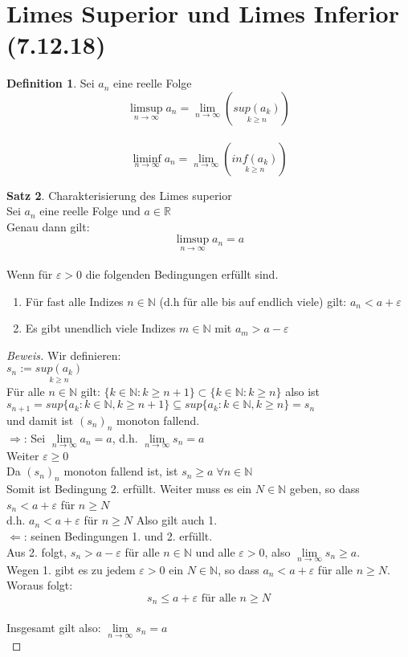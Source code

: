 \documentclass[12pt,a4paper,titlepage]{article} %
\theoremstyle{definition}
\newtheorem{satz}{Satz}[subsection]
\newtheorem{defi}[satz]{Definition}
\theoremstyle{remark}
\newenvironment{bew}{\begin{proof}[Beweis]}{\end{proof}}
\newcommand{\N}{\mathbb{N}}
\newcommand{\R}{\mathbb{R}}
\newcommand{\limes}[1]{\lim\limits_{#1\rightarrow\infty}}
\newcommand{\limessup}[1]{\limsup \limits_{#1\rightarrow\infty}}
\newcommand{\limesinf}[1]{\liminf \limits_{#1\rightarrow\infty}}
\begin{document}
	\section{Limes Superior und Limes Inferior (7.12.18)}
	\begin{defi}
		Sei \(a_n\) eine reelle Folge\\
		\[\limessup{n} a_n = \limes{n} (\underset{k \geq n}{sup(a_k)}) \]\\
		\[\limesinf{n} a_n = \limes{n} (\underset{k \geq n}{inf(a_k)}) \]
	\end{defi}
	\begin{satz}
		Charakterisierung des Limes superior\\
		Sei \(a_n\) eine reelle Folge und \(a \in \R\)\\
		Genau dann gilt:\\
		\[\limessup{n} a_n = a\]\\
		Wenn für \(\varepsilon > 0\) die folgenden Bedingungen erfüllt sind.\\
		\begin{enumerate}
			\item Für fast alle Indizes \(n \in \N\) (d.h für alle bis auf endlich viele) gilt: \(a_n < a+ \varepsilon\)
			\item Es gibt unendlich viele Indizes \(m \in \N\) mit \(a_m > a - \varepsilon\)
		\end{enumerate}
	\end{satz}
	\begin{bew}
		Wir definieren:\\
		\(s_n := \underset{k \geq n}{sup(a_k)}\)\\
		Für alle \(n \in \N\) gilt: \(\{k \in \N: k \geq n+1\} \subset \{k \in \N: k \geq n\}\) also ist\\
		\(s_{n+1} = sup\{a_k: k \in \N, k \geq n+1\} \subseteq sup\{a_k: k \in \N, k \geq n\} = s_n\)\\
		und damit ist \((s_n)_n\) monoton fallend.\\
		\(\Rightarrow\): Sei \(\limes{n} a_n = a\), d.h. \(\limes{n} s_n = a\)\\
		Weiter \(\varepsilon \geq 0\)\\
		Da \((s_n)_n\) monoton fallend ist, ist \(s_n \geq a \; \forall n \in \N\)\\
		Somit ist Bedingung 2. erfüllt. Weiter muss es ein \(N \in \N\) geben, so dass \(s_n < a + \varepsilon\) für \(n \geq N\)\\
		d.h. \(a_n < a + \varepsilon\) für \(n \geq N\) Also gilt auch 1.\\
		\(\Leftarrow\): seinen Bedingungen 1. und 2. erfüllt.\\
		Aus 2. folgt, \(s_n > a - \varepsilon\) für alle \(n \in \N\) und alle \(\varepsilon > 0\), also \(\limes{n} s_n \geq a\).\\
		Wegen 1. gibt es zu jedem \(\varepsilon > 0\) ein \(N \in \N\), so dass \(a_n < a + \varepsilon\) für alle \(n \geq N\).\\
		Woraus folgt:\\
		\[s_n \leq a + \varepsilon \text{ für alle } n \geq N\]\\
		Insgesamt gilt also: \(\limes{n} s_n = a\)\\
	\end{bew}
\end{document}

